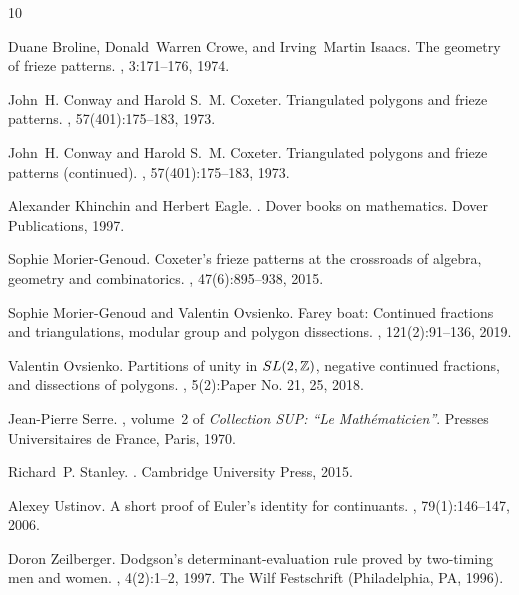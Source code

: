 \documentclass[a4paper,11pt]{amsart}
\theoremstyle{plain}
\theoremstyle{remark}
\theoremstyle{definition}
\numberwithin{equation}{section}
\numberwithin{figure}{section}
\begin{document}
\begin{thebibliography}{10}

Duane Broline, Donald~Warren Crowe, and Irving~Martin Isaacs.
\newblock The geometry of frieze patterns.
, 3:171--176, 1974.

John~H. Conway and Harold S.~M. Coxeter.
\newblock Triangulated polygons and frieze patterns.
, 57(401):175--183, 1973.

John~H. Conway and Harold S.~M. Coxeter.
\newblock Triangulated polygons and frieze patterns (continued).
, 57(401):175--183, 1973.

Alexander Khinchin and Herbert Eagle.
.
\newblock Dover books on mathematics. Dover Publications, 1997.

Sophie Morier-Genoud.
\newblock Coxeter's frieze patterns at the crossroads of algebra, geometry and combinatorics.
, 47(6):895--938, 2015.

Sophie Morier-Genoud and Valentin Ovsienko.
\newblock Farey boat: Continued fractions and triangulations, modular group and polygon dissections.
, 121(2):91--136, 2019.

Valentin Ovsienko.
\newblock Partitions of unity in {$SL(2,\Bbb Z)$}, negative continued fractions, and dissections of polygons.
, 5(2):Paper No. 21, 25, 2018.

Jean-Pierre Serre.
, volume~2 of {\em Collection SUP: ``Le Math\'{e}maticien''}.
\newblock Presses Universitaires de France, Paris, 1970.

Richard~P. Stanley.
.
\newblock Cambridge University Press, 2015.

Alexey Ustinov.
\newblock A short proof of {E}uler's identity for continuants.
, 79(1):146--147, 2006.

Doron Zeilberger.
\newblock Dodgson's determinant-evaluation rule proved by two-timing men and women.
, 4(2):1--2, 1997.
\newblock The Wilf Festschrift (Philadelphia, PA, 1996).

\end{thebibliography}



%
%
\end{document}
